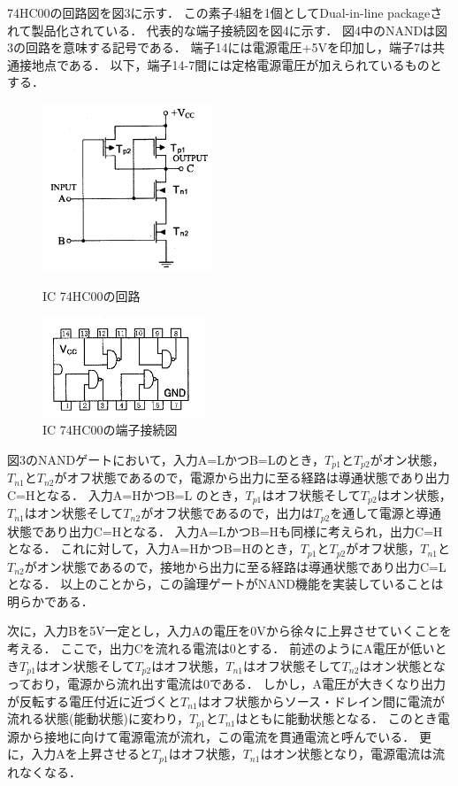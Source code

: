 \documentclass[10pt, a4j, dvipdfmx]{jarticle}
\begin{document}
74HC00の回路図を図3に示す．
この素子4組を1個としてDual-in-line packageされて製品化されている．
代表的な端子接続図を図4に示す．
図4中のNANDは図3の回路を意味する記号である．
端子14には電源電圧+5Vを印加し，端子7は共通接地点である．
以下，端子14-7間には定格電源電圧が加えられているものとする．
\begin{figure}[H]
  \begin{minipage}{0.5\hsize}
    \centering
    \includegraphics[height=50mm]{実験テキスト/図3.png}
    \caption{IC 74HC00の回路}
  \end{minipage}
  \begin{minipage}{0.5\hsize}
    \centering
    \includegraphics[height=30mm]{実験テキスト/図4.png}
    \caption{IC 74HC00の端子接続図}
  \end{minipage}
\end{figure}

図3のNANDゲートにおいて，入力A=LかつB=Lのとき，$T_{p1}$と$T_{p2}$がオン状態，$T_{n1}$と$T_{n2}$がオフ状態であるので，電源から出力に至る経路は導通状態であり出力C=Hとなる．
入力A=HかつB=L のとき，$T_{p1}$はオフ状態そして$T_{p2}$はオン状態，$T_{n1}$はオン状態そして$T_{n2}$がオフ状態であるので，出力は$T_{p2}$を通して電源と導通状態であり出力C=Hとなる．
入力A=LかつB=Hも同様に考えられ，出力C=Hとなる．
これに対して，入力A=HかつB=Hのとき，$T_{p1}$と$T_{p2}$がオフ状態，$T_{n1}$と$T_{n2}$がオン状態であるので，接地から出力に至る経路は導通状態であり出力C=Lとなる．
以上のことから，この論理ゲートがNAND機能を実装していることは明らかである．

次に，入力Bを5V一定とし，入力Aの電圧を0Vから徐々に上昇させていくことを考える．
ここで，出力Cを流れる電流は0とする．
前述のようにA電圧が低いとき$T_{p1}$はオン状態そして$T_{p2}$はオフ状態，$T_{n1}$はオフ状態そして$T_{n2}$はオン状態となっており，電源から流れ出す電流は0である．
しかし，A電圧が大きくなり出力が反転する電圧付近に近づくと$T_{n1}$はオフ状態からソース・ドレイン間に電流が流れる状態(能動状態)に変わり，$T_{p1}$と$T_{n1}$はともに能動状態となる．
このとき電源から接地に向けて電源電流が流れ，この電流を貫通電流と呼んでいる．
更に，入力Aを上昇させると$T_{p1}$はオフ状態，$T_{n1}$はオン状態となり，電源電流は流れなくなる．
\end{document}
